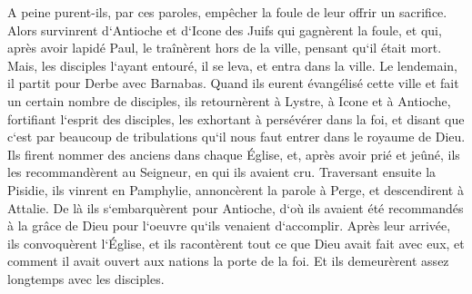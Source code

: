 \verse A peine purent-ils, par ces paroles, empêcher la foule de leur offrir un sacrifice. 
\verse Alors survinrent d`Antioche et d`Icone des Juifs qui gagnèrent la foule, et qui, après avoir lapidé Paul, le traînèrent hors de la ville, pensant qu`il était mort. 
\verse Mais, les disciples l`ayant entouré, il se leva, et entra dans la ville. Le lendemain, il partit pour Derbe avec Barnabas. 
\verse Quand ils eurent évangélisé cette ville et fait un certain nombre de disciples, ils retournèrent à Lystre, à Icone et à Antioche, 
\verse fortifiant l`esprit des disciples, les exhortant à persévérer dans la foi, et disant que c`est par beaucoup de tribulations qu`il nous faut entrer dans le royaume de Dieu. 
\verse Ils firent nommer des anciens dans chaque Église, et, après avoir prié et jeûné, ils les recommandèrent au Seigneur, en qui ils avaient cru. 
\verse Traversant ensuite la Pisidie, ils vinrent en Pamphylie, 
\verse annoncèrent la parole à Perge, et descendirent à Attalie. 
\verse De là ils s`embarquèrent pour Antioche, d`où ils avaient été recommandés à la grâce de Dieu pour l`oeuvre qu`ils venaient d`accomplir. 
\verse Après leur arrivée, ils convoquèrent l`Église, et ils racontèrent tout ce que Dieu avait fait avec eux, et comment il avait ouvert aux nations la porte de la foi. 
\verse Et ils demeurèrent assez longtemps avec les disciples. 

